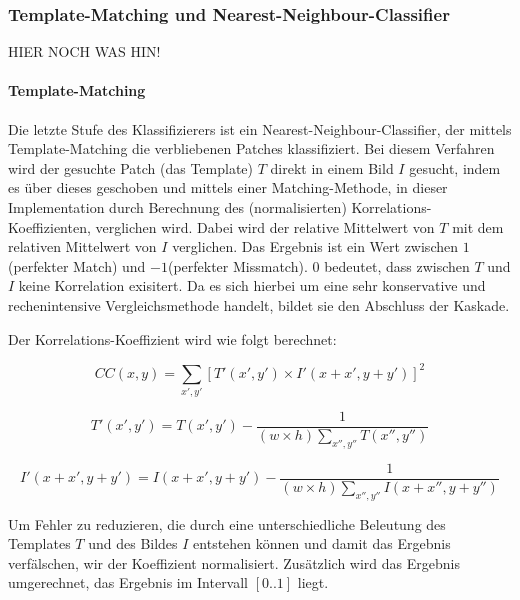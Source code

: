 
	\subsubsection{Template-Matching und Nearest-Neighbour-Classifier}

	HIER NOCH WAS HIN!

	\paragraph{Template-Matching}
	Die letzte Stufe des Klassifizierers ist ein Nearest-Neighbour-Classifier, der mittels Template-Matching die verbliebenen Patches klassifiziert. Bei diesem Verfahren wird der gesuchte Patch (das Template) $T$ direkt in einem Bild $I$ gesucht, indem es über dieses geschoben und mittels einer Matching-Methode, in dieser Implementation durch Berechnung des (normalisierten) Korrelations-Koeffizienten, verglichen wird. Dabei wird der relative Mittelwert von $T$ mit dem relativen Mittelwert von $I$ verglichen. Das Ergebnis ist ein Wert zwischen $1$(perfekter Match) und $-1$(perfekter Missmatch). $0$ bedeutet, dass zwischen $T$ und $I$ keine Korrelation exisitert. Da es sich hierbei um eine sehr konservative und rechenintensive Vergleichsmethode handelt, bildet sie den Abschluss der Kaskade.

	Der Korrelations-Koeffizient wird wie folgt berechnet:

	\begin{equation}
	CC(x,y)=\underset{x',y'}{\sum}[T'(x',y')\times I'(x+x',y+y')]^{2}
	\end{equation}


	\begin{equation}
	T'(x',y')=T(x',y')-\frac{1}{(w\times h)\underset{x'',y''}{\sum}T(x'',y'')}
	\end{equation}


	\begin{equation}
	I'(x+x',y+y')=I(x+x',y+y')-\frac{1}{(w\times h)\underset{x'',y''}{\sum}I(x+x'',y+y'')}
	\end{equation}

	Um Fehler zu reduzieren, die durch eine unterschiedliche Beleutung des Templates $T$ und des Bildes $I$ entstehen können und damit	das Ergebnis verfälschen, wir der Koeffizient normalisiert. Zusätzlich wird das Ergebnis umgerechnet, das Ergebnis im Intervall $[0..1]$	liegt.

